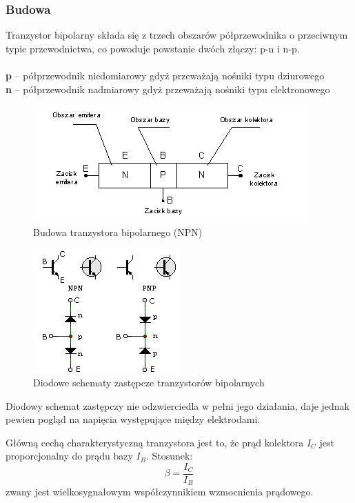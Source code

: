 \documentclass[a4paper,twoside]{report}
\begin{document}
\subsubsection{Budowa}

Tranzystor bipolarny składa się z trzech obszarów półprzewodnika o przeciwnym typie przewodnictwa, co powoduje powstanie dwóch złączy: p-n i n-p.\\\\
\textbf{p} – półprzewodnik niedomiarowy gdyż przeważają nośniki typu dziurowego\\
\textbf{n} – półprzewodnik nadmiarowy gdyż przeważają nośniki typu elektronowego

\begin{figure}[htbp]
\centering
\includegraphics[scale=0.8]{obrazy/tranzystory/budtranbip.png}
\caption{Budowa tranzystora bipolarnego (NPN)}
\end{figure}




\begin{figure}[htbp]
\centering
\includegraphics[scale=0.8]{obrazy/tranzystory/tranbipsche.png}
\caption{Diodowe schematy zastępcze tranzystorów bipolarnych}
\label{rys:tranBipDiody}
\end{figure}

Diodowy schemat zastępczy nie odzwierciedla w pełni jego działania, daje jednak pewien pogląd na napięcia występujące między elektrodami.


Główną cechą charakterystyczną tranzystora jest to, że prąd kolektora $I_C$ jest proporcjonalny do prądu bazy $I_B$. Stosunek:
\begin{equation}
\beta = \dfrac{I_C}{I_B}
\end{equation}
zwany jest wielkosygnałowym współczynnikiem wzmocnienia prądowego.
\end{document}
